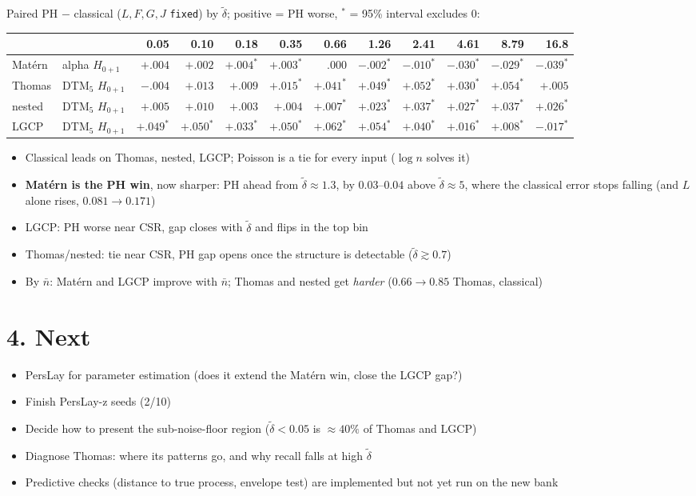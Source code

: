 \documentclass[10pt]{article}
\newcommand{\dt}{\tilde\delta}
\newcommand{\nb}{\bar n}
\begin{document}
\smallskip
Paired PH $-$ classical ($L,F,G,J$ \texttt{fixed}) by $\dt$; positive = PH worse, $^\ast$ = 95\% interval excludes 0:

\smallskip
{\small
\begin{tabular}{@{}llrrrrrrrrrr@{}}
\toprule
 & & 0.05 & 0.10 & 0.18 & 0.35 & 0.66 & 1.26 & 2.41 & 4.61 & 8.79 & 16.8 \\
\midrule
Mat\'ern & alpha $H_{0+1}$ & $+.004$ & $+.002$ & $+.004^\ast$ & $+.003^\ast$ & $.000$ & $-.002^\ast$ & $-.010^\ast$ & $-.030^\ast$ & $-.029^\ast$ & $-.039^\ast$ \\
Thomas   & DTM$_5$ $H_{0+1}$ & $-.004$ & $+.013$ & $+.009$ & $+.015^\ast$ & $+.041^\ast$ & $+.049^\ast$ & $+.052^\ast$ & $+.030^\ast$ & $+.054^\ast$ & $+.005$ \\
nested   & DTM$_5$ $H_{0+1}$ & $+.005$ & $+.010$ & $+.003$ & $+.004$ & $+.007^\ast$ & $+.023^\ast$ & $+.037^\ast$ & $+.027^\ast$ & $+.037^\ast$ & $+.026^\ast$ \\
LGCP     & DTM$_5$ $H_{0+1}$ & $+.049^\ast$ & $+.050^\ast$ & $+.033^\ast$ & $+.050^\ast$ & $+.062^\ast$ & $+.054^\ast$ & $+.040^\ast$ & $+.016^\ast$ & $+.008^\ast$ & $-.017^\ast$ \\
\bottomrule
\end{tabular}
}

\begin{itemize}
  \item Classical leads on Thomas, nested, LGCP; Poisson is a tie for every input ($\log n$ solves it)
  \item \textbf{Mat\'ern is the PH win}, now sharper: PH ahead from $\dt\approx1.3$, by $0.03$--$0.04$ above $\dt\approx5$, where the classical error stops falling (and $L$ alone rises, $0.081\to0.171$)
  \item LGCP: PH worse near CSR, gap closes with $\dt$ and flips in the top bin
  \item Thomas/nested: tie near CSR, PH gap opens once the structure is detectable ($\dt\gtrsim0.7$)
  \item By $\nb$: Mat\'ern and LGCP improve with $\nb$; Thomas and nested get \emph{harder} ($0.66\to0.85$ Thomas, classical)
\end{itemize}

\section*{4. Next}
\begin{itemize}
  \item PersLay for parameter estimation (does it extend the Mat\'ern win, close the LGCP gap?)
  \item Finish PersLay-z seeds (2/10)
  \item Decide how to present the sub-noise-floor region ($\dt<0.05$ is $\approx40\%$ of Thomas and LGCP)
  \item Diagnose Thomas: where its patterns go, and why recall falls at high $\dt$
  \item Predictive checks (distance to true process, envelope test) are implemented but not yet run on the new bank
\end{itemize}
\end{document}
